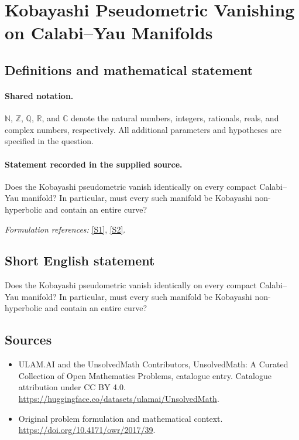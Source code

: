 \documentclass[11pt]{article}
\newcommand{\sref}[2]{\hyperlink{source:#1:#2}{[S#2]}}
\begin{document}
\section{Kobayashi Pseudometric Vanishing on Calabi–Yau Manifolds}\label{statement}

\subsection{Definitions and mathematical statement}

\paragraph{Shared notation.}$\mathbb N$, $\mathbb Z$, $\mathbb Q$, $\mathbb R$, and $\mathbb C$ denote the natural numbers, integers, rationals, reals, and complex numbers, respectively. All additional parameters and hypotheses are specified in the question.


\paragraph{Statement recorded in the supplied source.}
Does the Kobayashi pseudometric vanish identically on every compact Calabi–Yau manifold? In particular, must every such manifold be Kobayashi non-hyperbolic and contain an entire curve?
\par\smallskip\textit{Formulation references:} \sref{statement}{1}, \sref{statement}{2}.
\subsection{Short English statement}
Does the Kobayashi pseudometric vanish identically on every compact Calabi–Yau manifold? In particular, must every such manifold be Kobayashi non-hyperbolic and contain an entire curve?
\subsection{Sources}
\begin{itemize}
\item[\hypertarget{source:statement:1}{S1}] ULAM.AI and the UnsolvedMath Contributors, UnsolvedMath: A Curated Collection of Open Mathematics Problems, catalogue entry. Catalogue attribution under CC BY 4.0.
\url{https://huggingface.co/datasets/ulamai/UnsolvedMath}.
\item[\hypertarget{source:statement:2}{S2}] Original problem formulation and mathematical context.
\url{https://doi.org/10.4171/owr/2017/39}.
\end{itemize}
\label{end:statement}
\end{document}
